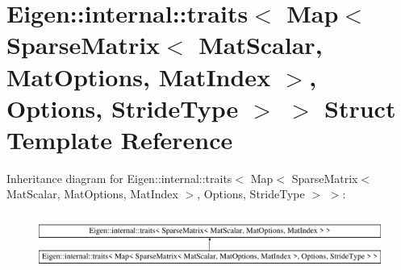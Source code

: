 \hypertarget{struct_eigen_1_1internal_1_1traits_3_01_map_3_01_sparse_matrix_3_01_mat_scalar_00_01_mat_optionsc906e4e1b3a968ac003455586a92664c}{}\section{Eigen\+::internal\+::traits$<$ Map$<$ Sparse\+Matrix$<$ Mat\+Scalar, Mat\+Options, Mat\+Index $>$, Options, Stride\+Type $>$ $>$ Struct Template Reference}
\label{struct_eigen_1_1internal_1_1traits_3_01_map_3_01_sparse_matrix_3_01_mat_scalar_00_01_mat_optionsc906e4e1b3a968ac003455586a92664c}
Inheritance diagram for Eigen\+::internal\+::traits$<$ Map$<$ Sparse\+Matrix$<$ Mat\+Scalar, Mat\+Options, Mat\+Index $>$, Options, Stride\+Type $>$ $>$\+:\begin{figure}[H]
\begin{center}
\leavevmode
\includegraphics[height=1.812298cm]{struct_eigen_1_1internal_1_1traits_3_01_map_3_01_sparse_matrix_3_01_mat_scalar_00_01_mat_optionsc906e4e1b3a968ac003455586a92664c}
\end{center}
\end{figure}
